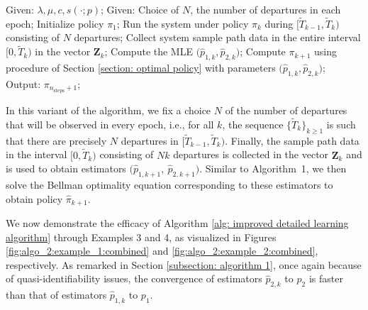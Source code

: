 \documentclass[11pt]{article}
\renewcommand{\thealgorithm}{\arabic{algorithm}}
\theoremstyle{remark}
\theoremstyle{definition}
\newcommand{\bs}[1]{{\boldsymbol #1 }}
\numberwithin{equation}{section}
\begin{document}
\begin{algorithm}[H]
    \renewcommand{\thealgorithm}{1b}
    \caption{Improved learning algorithm}
    \label{alg: improved detailed learning algorithm}
    \begin{algorithmic}[1]
        \State Given: $\lambda, \mu, c, s(\cdot;p)$;
        \State Given: Choice of $N$, the number of departures in each epoch;
        \State Initialize policy $\pi_1$;
        \State Run the system under policy $\pi_k$ during $\Big[\widetilde{T}_{k-1}, \widetilde{T}_k\Big)$ consisting of $N$ departures;
        \State Collect system sample path data in the entire interval $\Big[0, \widetilde{T}_k\Big)$ in the vector $\bs Z_k$;
        \State Compute the MLE $\big(\widehat{p}_{1,k},\widehat{p}_{2,k}\big)$;
        \State Compute $\pi_{k+1}$ using procedure of Section \ref{section: optimal policy} with parameters $\big(\widehat{p}_{1,k},\widehat{p}_{2,k}\big)$;
        \EndFor
        \State Output: $\pi_{n_{\text{steps}}+1}$;
    \end{algorithmic}
\end{algorithm}

In this variant of the algorithm, we fix a choice $N$ of the number of departures that will be observed in every epoch, i.e., for all $k$, the sequence $\big\{\widetilde{T}_k\big\}_{k \geq 1}$ is such that there are precisely $N$ departures in $\big[\widetilde{T}_{k-1}, \widetilde{T}_k\big)$.
Finally, the sample path data in the interval $\big[0, \widetilde{T}_k\big)$ consisting of $Nk$ departures is collected in the vector $\bs Z_k$ and is used to obtain estimators $\big(\widehat{p}_{1,k+1}, \ \widehat{p}_{2,k+1}\big)$. 
Similar to Algorithm~1, we then solve the Bellman optimality equation corresponding to these estimators to obtain policy $\widehat{\pi}_{k+1}$.

We now demonstrate the efficacy of Algorithm \ref{alg: improved detailed learning algorithm}  through Examples 3 and 4, as visualized in Figures \ref{fig:algo_2:example_1:combined} and \ref{fig:algo_2:example_2:combined}, respectively.
As remarked in Section \ref{subsection: algorithm 1}, once again because of quasi-identifiability issues, the convergence of estimators $\widehat{p}_{2,k}$ to $p_2$ is faster than that of estimators $\widehat{p}_{1,k}$ to $p_1$.

\end{document}
